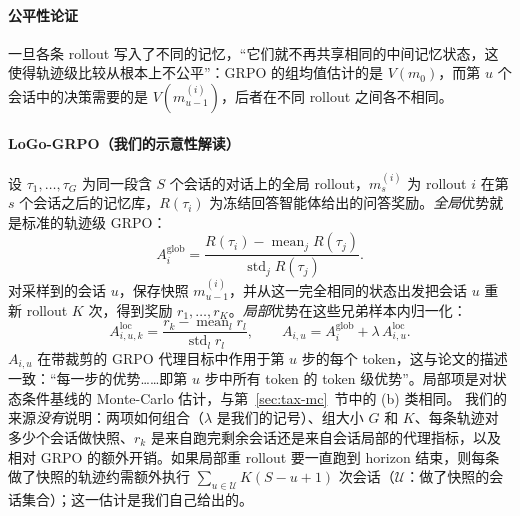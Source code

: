 \paragraph{公平性论证}
一旦各条 rollout 写入了不同的记忆，“它们就不再共享相同的中间记忆状态，这使得轨迹级比较从根本上不公平”\unverified：GRPO 的组均值估计的是 $V(m_0)$，而第 $u$ 个会话中的决策需要的是 $V(m^{(i)}_{u-1})$，后者在不同 rollout 之间各不相同。

\paragraph{LoGo-GRPO（我们的示意性解读）}
设 $\tau_1,\dots,\tau_G$ 为同一段含 $S$ 个会话的对话上的全局 rollout，$m^{(i)}_{s}$ 为 rollout $i$ 在第 $s$ 个会话之后的记忆库，$R(\tau_i)$ 为冻结回答智能体给出的问答奖励。\emph{全局}优势就是标准的轨迹级 GRPO：
\begin{equation}
A^{\mathrm{glob}}_i=\frac{R(\tau_i)-\operatorname{mean}_{j}R(\tau_j)}{\operatorname{std}_{j}R(\tau_j)}.
\end{equation}
对采样到的会话 $u$，保存快照 $m^{(i)}_{u-1}$，并从这一完全相同的状态出发把会话 $u$ 重新 rollout $K$ 次，得到奖励 $r_1,\dots,r_K$。\emph{局部}优势在这些兄弟样本内归一化：
\begin{equation}
A^{\mathrm{loc}}_{i,u,k}=\frac{r_k-\operatorname{mean}_{l}r_l}{\operatorname{std}_{l}r_l},\qquad
A_{i,u}=A^{\mathrm{glob}}_i+\lambda\,A^{\mathrm{loc}}_{i,u}.
\end{equation}
$A_{i,u}$ 在带裁剪的 GRPO 代理目标中作用于第 $u$ 步的每个 token，这与论文的描述一致：“每一步的优势……即第 $u$ 步中所有 token 的 token 级优势”\unverified。局部项是对状态条件基线的 Monte-Carlo 估计，与第~\ref{sec:tax-mc}~节中的 (b) 类相同。
我们的来源\emph{没有}说明：两项如何组合（$\lambda$ 是我们的记号）、组大小 $G$ 和 $K$、每条轨迹对多少个会话做快照、$r_k$ 是来自跑完剩余会话还是来自会话局部的代理指标，以及相对 GRPO 的额外开销。如果局部重 rollout 要一直跑到 horizon 结束，则每条做了快照的轨迹约需额外执行 $\sum_{u\in\mathcal U}K(S-u+1)$ 次会话（$\mathcal U$：做了快照的会话集合）；这一估计是我们自己给出的。

